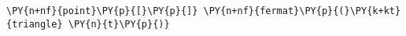 \begin{Verbatim}[commandchars=\\\{\}]
    \PY{n+nf}{point}\PY{p}{[}\PY{p}{]} \PY{n+nf}{fermat}\PY{p}{(}\PY{k+kt}{triangle} \PY{n}{t}\PY{p}{)}
\end{Verbatim}
